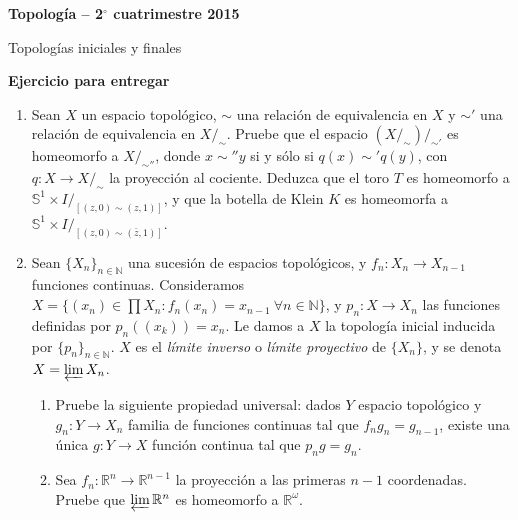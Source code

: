 \documentclass[11pt]{article}
\begin{document}
\pagestyle{empty}
\pagestyle{fancy}
\fancyfoot[CO]{\slshape \thepage}
\renewcommand{\headrulewidth}{0pt}



\centerline{\bf Topolog\'ia -- 2$^\circ$
cuatrimestre 2015}
\centerline{\sc Topolog\'ias iniciales y finales}

\bigskip

\textbf{Ejercicio para entregar}

\begin{enumerate}

\item Sean $X$ un espacio topol\'ogico, $\sim$ una relaci\'on de equivalencia en $X$ y $\sim'$ una relaci\'on de equivalencia en $X/_{\sim}$. Pruebe que el espacio $\left(X/_{\sim} \right)/_{\sim'}$ es homeomorfo a $X/_{\sim''}$, donde $x \sim'' y$ si y s\'olo si $q(x) \sim' q(y)$, con $q: X\rightarrow X/_{\sim}$ la proyecci\'on al cociente.
Deduzca que el toro $T$ es homeomorfo a $\mathbb{S}^1 \times I /_{[(z,0) \sim (z, 1)]}$, y que la botella de Klein $K$ es homeomorfa a $\mathbb{S}^1 \times I /_{[(z,0) \sim (\bar{z}, 1)]}$.

\item Sean $\{X_n\}_{n\in \mathbb{N}}$ una sucesi\'on de espacios topol\'ogicos,
 y $f_n : X_n \rightarrow X_{n-1}$ funciones continuas. Consideramos $X= \{(x_n)\in \prod X_n: f_n(x_n) = x_{n-1} ~ \forall n\in \mathbb{N}\}$,
  y $p_n : X\rightarrow X_n$ las funciones definidas por $p_n((x_k)) = x_n$. Le damos a $X$ la topolog\'ia inicial inducida por $\{p_n\}_{n\in \mathbb{N}}$. $X$ es el \textit{l\'imite inverso} o \textit{l\'imite proyectivo} de $\{X_n\}$, y se denota $X=\varprojlim X_n$.
 
\begin{enumerate}

\item Pruebe la siguiente propiedad universal: dados $Y$ espacio topol\'ogico y $g_n: Y \rightarrow X_n$ familia de funciones continuas tal que $f_n g_n = g_{n-1}$, existe una \'unica $g:Y\rightarrow X$ funci\'on continua tal que $p_n g = g_n$.
\item Sea $f_n : \mathbb{R}^n \rightarrow \mathbb{R}^{n-1}$ la proyecci\'on a las primeras $n-1$ coordenadas. Pruebe que $\varprojlim \mathbb{R}^n$ es homeomorfo a $\mathbb{R}^\mathbb{\omega}$.
\end{enumerate}
\end{enumerate}
\end{document}
